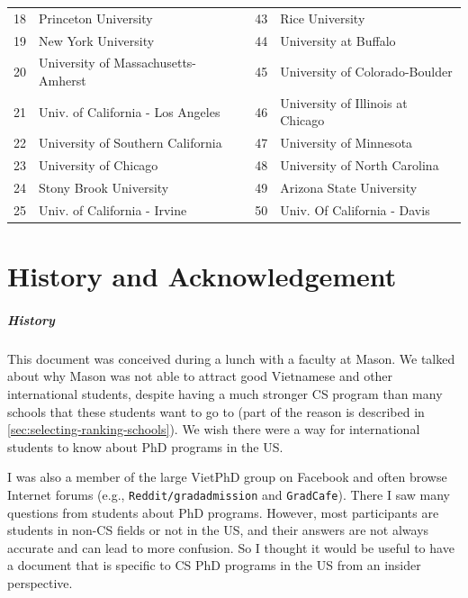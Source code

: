 \documentclass[oneside,11pt,dvipsnames]{book}
\newcommand{\red}[1]{{\color{red}{#1}}}
\begin{document}
\begin{table}[h]
\begin{tabular}{rl|rl}
    18 & Princeton University\red{$^*$}  & 43& Rice University\\
    19 & New York University  & 44&  University at Buffalo\red{$^*$}\\
    20 &  University of Massachusetts-Amherst\red{$^*$} &45& University of Colorado-Boulder \\
    21 & Univ. of California - Los Angeles &46& University of Illinois at Chicago  \\
    22 & University of Southern California &47& University of Minnesota \\
    23 & University of Chicago &48& University of North Carolina\red{$^*$} \\
    24 & Stony Brook University\red{$^*$} &49& Arizona State University\red{$^*$} \\
    25 &  Univ. of California - Irvine&50& Univ. Of California - Davis \\
    \bottomrule
  \end{tabular}
\end{table}

\chapter{History and Acknowledgement}\label{sec:ack}
\paragraph{History} This document was conceived during a lunch with a faculty at Mason.  We talked about why Mason was not able to attract good Vietnamese and other international students, despite having a much stronger CS program than many schools that these students want to go to (part of the reason is described in \autoref{sec:selecting-ranking-schools}). We wish there were a way for international students to know about PhD programs in the US.

I was also a member of the large VietPhD group on Facebook and often browse Internet forums (e.g., \texttt{Reddit/gradadmission} and \texttt{GradCafe}). There I saw many questions from students about PhD programs.  However, most participants are students in non-CS fields or not in the US, and their answers are not always accurate and can lead to more confusion. So I thought it would be useful to have a document that is specific to CS PhD programs in the US from an insider perspective.
\end{document}
